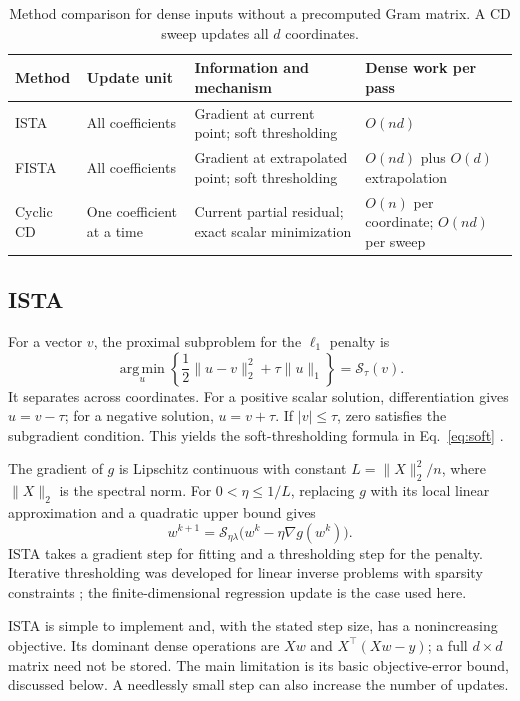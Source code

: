 \documentclass[11pt,a4paper]{article}
\newcommand{\soft}{\mathcal{S}}
\begin{document}
\begin{table}[htbp]
\centering\small
\begin{tabularx}{\linewidth}{@{}p{.13\linewidth}YYY@{}}
\toprule
Method & Update unit & Information and mechanism & Dense work per pass\\
\midrule
ISTA & All coefficients & Gradient at current point; soft thresholding & $O(nd)$\\
FISTA & All coefficients & Gradient at extrapolated point; soft thresholding & $O(nd)$ plus $O(d)$ extrapolation\\
Cyclic CD & One coefficient at a time & Current partial residual; exact scalar minimization & $O(n)$ per coordinate; $O(nd)$ per sweep\\
\bottomrule
\end{tabularx}
\caption{Method comparison for dense inputs without a precomputed Gram matrix. A CD sweep updates all $d$ coordinates.}
\label{tab:taxonomy}
\end{table}

\subsection{ISTA}
For a vector $v$, the proximal subproblem for the $\ell_1$ penalty is
\begin{equation}
\operatorname*{arg\,min}_u\left\{\frac12\|u-v\|_2^2+\tau\|u\|_1\right\}
=\soft_\tau(v).
\end{equation}
It separates across coordinates. For a positive scalar solution, differentiation gives $u=v-\tau$; for a negative solution, $u=v+\tau$. If $|v|\leq\tau$, zero satisfies the subgradient condition. This yields the soft-thresholding formula in Eq.~\eqref{eq:soft} \cite{parikh2014}.

The gradient of $g$ is Lipschitz continuous with constant $L=\|X\|_2^2/n$, where $\|X\|_2$ is the spectral norm. For $0<\eta\leq1/L$, replacing $g$ with its local linear approximation and a quadratic upper bound gives
\begin{equation}
w^{k+1}=\soft_{\eta\lambda}\bigl(w^k-\eta\nabla g(w^k)\bigr).
\label{eq:ista}
\end{equation}
ISTA takes a gradient step for fitting and a thresholding step for the penalty. Iterative thresholding was developed for linear inverse problems with sparsity constraints \cite{daubechies2004}; the finite-dimensional regression update is the case used here.

ISTA is simple to implement and, with the stated step size, has a nonincreasing objective. Its dominant dense operations are $Xw$ and $X^\top(Xw-y)$; a full $d\times d$ matrix need not be stored. The main limitation is its basic objective-error bound, discussed below. A needlessly small step can also increase the number of updates.
\end{document}

